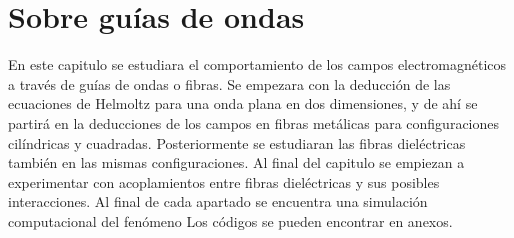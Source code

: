 \chapter{Sobre guías de ondas}
En este capitulo se estudiara el comportamiento de los campos electromagnéticos a través de guías de ondas o fibras. Se empezara con la deducción de las ecuaciones de Helmoltz para una onda plana en dos dimensiones, y de ahí se partirá en la deducciones de los campos en fibras metálicas para configuraciones cilíndricas y cuadradas. Posteriormente se estudiaran las fibras dieléctricas también en las mismas configuraciones. Al final del capitulo se empiezan a experimentar con acoplamientos entre fibras dieléctricas y sus posibles interacciones. Al final de cada apartado se encuentra una simulación computacional del fenómeno Los códigos se pueden encontrar en anexos.
